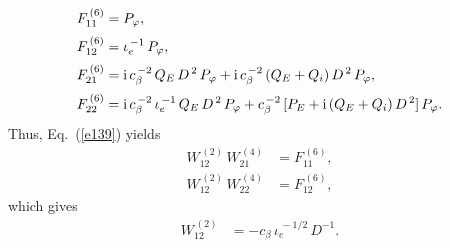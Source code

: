\documentclass[12pt,prb,aps]{revtex4-1}
\begin{document}
\begin{align}
F^{\,(6)}_{11} &=P_\varphi,\\[0.5ex]
F^{\,(6)}_{12} &= \iota_e^{\,-1}\,P_\varphi,\\[0.5ex]
F^{\,(6)}_{21} &={\rm i}\,c_\beta^{\,-2}\,Q_E\,D^{\,2}\,P_\varphi + {\rm i}\,c_\beta^{\,-2}\,(Q_E+Q_i)\,D^{\,2}\,P_\varphi,\\[0.5ex]
F^{\,(6)}_{22} &={\rm i}\,c_\beta^{\,-2}\,\iota_e^{\,-1}\,Q_E\,D^{\,2}\,P_\varphi + c_\beta^{\,-2}\,[P_E+{\rm i}\,(Q_E+Q_i)\,D^{\,2}]\,P_\varphi.
\end{align}
Thus, Eq.~(\ref{e139}) yields
\begin{align}
W_{12}^{\,(2)}\,W_{21}^{\,(4)} &= F_{11}^{\,(6)},\\[0.5ex]
W_{12}^{\,(2)}\,W_{22}^{\,(4)} &= F_{12}^{\,(6)},
\end{align}
which gives 
\begin{align}
W_{12}^{\,(2)} &= - c_\beta\,\iota_e^{\,-1/2}\,D^{-1}.
\end{align}
\end{document}
